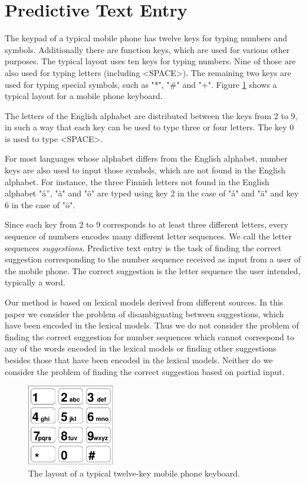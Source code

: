 \documentclass[a4paper,conference]{IEEEtran}
\begin{document}
\section{Predictive Text Entry}
\label{sec:text-entry}

The keypad of a typical mobile phone has twelve keys for typing
numbers and symbols. Additionally there are function keys, which are
used for various other purposes. The typical layout uses ten keys for
typing numbers. Nine of those are also used for typing letters (including
<SPACE>). The remaining two keys are used for typing special symbols,
such as "*", "\#" and "+". Figure \ref{fig:keypad} shows a typical layout
for a mobile phone keyboard.

The letters of the English alphabet are distributed between the keys
from 2 to 9, in such a way that each key can be used to type three or
four letters. The key 0 is used to type <SPACE>.

For most languages whose alphabet differs from the English alphabet,
number keys are also used to input those symbols, which are
not found in the English alphabet. For instance, the three Finnish letters not
found in the English alphabet "å'', "\"{a}" and "\"{o}" are typed
using key 2 in the case of "å" and "\"{a}" and key 6 in the case of "\"{o}".

Since each key from 2 to 9 corresponds to at least three different
letters, every sequence of numbers encodes many different letter
sequences. We call the letter sequences {\it suggestions}. Predictive
text entry is the task of finding the correct suggestion corresponding
to the number sequence received as input from a user of the mobile
phone. The correct suggestion is the letter sequence the user
intended, typically a word.

Our method is based on lexical models derived from different
sources. In this paper we consider the problem of disambiguating
between suggestions, which have been encoded in the lexical
models. Thus we do not consider the problem of finding the correct
suggestion for number sequences which cannot correspond to any of the
words encoded in the lexical models or finding other suggestions besides
those that have been encoded in the lexical models. Neither do we
consider the problem of finding the correct suggestion based on
partial input.

\begin{figure}
\begin{center}
\includegraphics[width=1.5in]{keypad.pdf}
\end{center}
\caption{The layout of a typical twelve-key mobile phone keyboard.}
\label{fig:keypad}
\end{figure}
\end{document}
